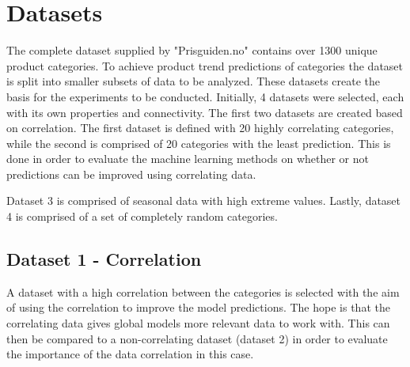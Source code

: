 \section{Datasets}
\label{section:Architecture:Dataset}

The complete dataset supplied by "Prisguiden.no" contains over 1300 unique product categories.
To achieve product trend predictions of categories the dataset is split into smaller subsets of data to be analyzed.
These datasets create the basis for the experiments to be conducted.
Initially, 4 datasets were selected, each with its own properties and connectivity.
The first two datasets are created based on correlation.
The first dataset is defined with 20 highly correlating categories, while the second is comprised of 20 categories with the least prediction.
This is done in order to evaluate the machine learning methods on whether or not predictions can be improved using correlating data.

Dataset 3 is comprised of seasonal data with high extreme values.
Lastly, dataset 4 is comprised of a set of completely random categories.


\subsection{Dataset 1 - Correlation}

A dataset with a high correlation between the categories is selected with the aim of using the correlation to improve the model predictions.
The hope is that the correlating data gives global models more relevant data to work with.
This can then be compared to a non-correlating dataset (dataset 2) in order to evaluate the importance of the data correlation in this case.


